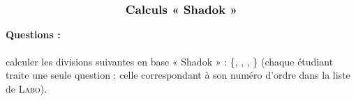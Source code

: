 \documentclass[11pt,a4paper]{article}
\begin{document}
\entete

\autoevaluation

$$\mbox{\textbf{\large Calculs « Shadok »}}$$

%
%
%

\paragraph{Questions :} calculer les divisions suivantes en base « Shadok » :
\{\ga{}, \bu{}, \zo{}, \meu{}\}
(chaque étudiant traite une seule question : celle correspondant à son numéro d'ordre dans la liste de \textsc{Labo}).
\end{document}
